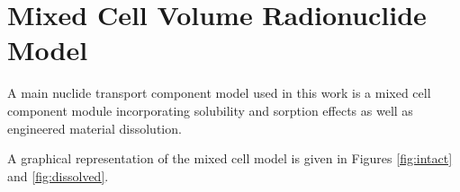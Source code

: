 \section{Mixed Cell Volume Radionuclide Model}\label{sec:mixed_cell}







A main nuclide transport component model used in this work is a mixed cell 
component module incorporating solubility and sorption effects as well as  
engineered material dissolution.

A graphical representation of the mixed cell model is given in Figures 
\ref{fig:intact} and \ref{fig:dissolved}.  

